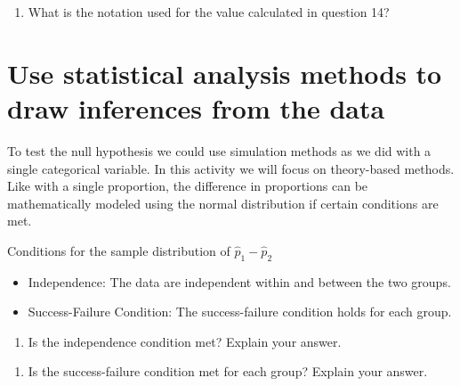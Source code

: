 \documentclass[
]{report}
\providecommand{\tightlist}{%
  \setlength{\itemsep}{0pt}\setlength{\parskip}{0pt}}
\begin{document}
\begin{enumerate}
\def\labelenumi{\arabic{enumi}.}
\setcounter{enumi}{14}
\tightlist
\item
  What is the notation used for the value calculated in question 14?
\end{enumerate}

\vspace{0.5in}

\hypertarget{use-statistical-analysis-methods-to-draw-inferences-from-the-data}{%
\section{Use statistical analysis methods to draw inferences from the data}\label{use-statistical-analysis-methods-to-draw-inferences-from-the-data}}

To test the null hypothesis we could use simulation methods as we did with a single categorical variable. In this activity we will focus on theory-based methods. Like with a single proportion, the difference in proportions can be mathematically modeled using the normal distribution if certain conditions are met.

Conditions for the sample distribution of \(\hat{p}_1-\hat{p}_2\)

\begin{itemize}
\item
  Independence: The data are independent within and between the two groups.
\item
  Success-Failure Condition: The success-failure condition holds for each group.
\end{itemize}

\vspace{.25in}

\begin{enumerate}
\def\labelenumi{\arabic{enumi}.}
\setcounter{enumi}{15}
\tightlist
\item
  Is the independence condition met? Explain your answer.
\end{enumerate}

\vspace{1in}

\begin{enumerate}
\def\labelenumi{\arabic{enumi}.}
\setcounter{enumi}{16}
\tightlist
\item
  Is the success-failure condition met for each group? Explain your answer.
\end{enumerate}

\vspace{1in}
\end{document}

